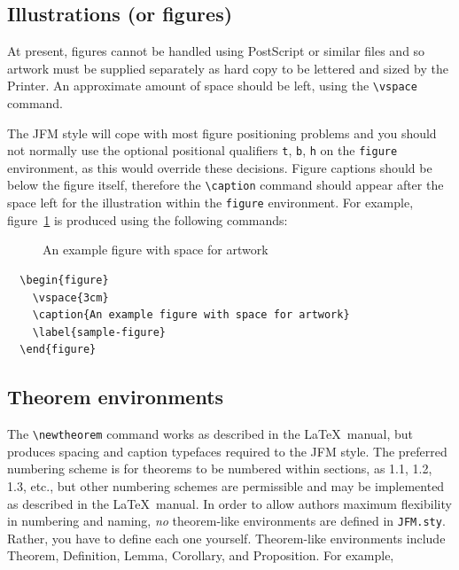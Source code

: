 \subsection{Illustrations (or figures)}

At present, figures cannot be handled using PostScript or similar files 
and so artwork must be supplied separately as hard copy to be lettered
and sized by the Printer. An approximate amount of space should be left, using the \verb"\vspace" command.

The JFM style will cope with most figure positioning problems and you should not
normally use the optional positional qualifiers \verb"t", \verb"b", \verb"h"
on the \verb"figure" environment, as this would override these decisions.
Figure captions should be below the figure itself, therefore the \verb"\caption"
command should appear after the space left for the illustration within the
\verb"figure" environment.
For example, figure~\ref{sample-figure} is produced using the following
commands:
\begin{figure}
  \vspace{3cm}
  \caption{An example figure with space for artwork}
  \label{sample-figure}
\end{figure}

\smallskip
\begin{verbatim}
  \begin{figure}
    \vspace{3cm}
    \caption{An example figure with space for artwork}
    \label{sample-figure}
  \end{figure}
\end{verbatim}
\smallskip

\subsection{Theorem environments}\label{sectTheor}

The \verb"\newtheorem" command works as described in the \LaTeX\ manual,
but produces spacing and caption typefaces required to the JFM style.  The
preferred numbering scheme is for theorems to be numbered within sections,
as 1.1, 1.2, 1.3, etc., but other numbering schemes are permissible and
may be implemented as described in the \LaTeX\ manual.  In order to allow
authors maximum flexibility in numbering and naming, {\em no} theorem-like
environments are defined in \verb"JFM.sty".  Rather, you have to define
each one yourself.  Theorem-like environments include Theorem, Definition,
Lemma, Corollary, and Proposition.  For example,

